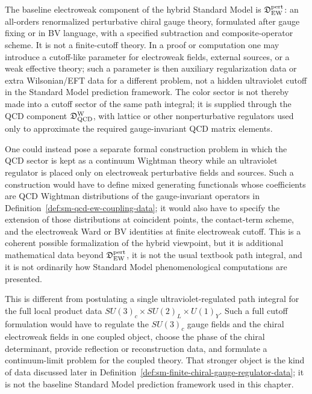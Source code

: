 \begin{remark}
\label{rem:sm-cutoff-path-integral-not-baseline}
The baseline electroweak component of the hybrid Standard Model is
\(\mathfrak D_{\rm EW}^{\rm pert}\): an all-orders renormalized perturbative
chiral gauge theory, formulated after gauge fixing or in BV language, with a
specified subtraction and composite-operator scheme.  It is not a
finite-cutoff theory.  In a proof or computation one may introduce a
cutoff-like parameter for electroweak fields, external sources, or a weak
effective theory; such a parameter is then auxiliary regularization data or
extra Wilsonian/EFT data for a different problem, not a hidden ultraviolet
cutoff in the Standard Model prediction framework.  The color sector is not
thereby made into a cutoff sector of the same path integral; it is supplied
through the QCD component \(\mathfrak D_{\rm QCD}^{\rm W}\), with lattice or
other nonperturbative regulators used only to approximate the required
gauge-invariant QCD matrix elements.

One could instead pose a separate formal construction problem in which the QCD
sector is kept as a continuum Wightman theory while an ultraviolet regulator
is placed only on electroweak perturbative fields and sources.  Such a
construction would have to define mixed generating functionals whose
coefficients are QCD Wightman distributions of the gauge-invariant operators
in Definition~\ref{def:sm-qcd-ew-coupling-data}; it would also have to
specify the extension of those distributions at coincident points, the
contact-term scheme, and the electroweak Ward or BV identities at finite
electroweak cutoff.  This is a coherent possible formalization of the hybrid
viewpoint, but it is additional mathematical data beyond
\(\mathfrak D_{\rm EW}^{\rm pert}\), it is not the usual textbook path
integral, and it is not ordinarily how Standard Model phenomenological
computations are presented.

This is different from postulating a single ultraviolet-regulated path
integral for the full local product data
\(SU(3)_c\times SU(2)_L\times U(1)_Y\).  Such a full cutoff formulation would
have to regulate the \(SU(3)_c\) gauge fields and the chiral electroweak
fields in one coupled object, choose the phase of the chiral determinant,
provide reflection or reconstruction data, and formulate a continuum-limit
problem for the coupled theory.  That stronger object is the kind of data
discussed later in
Definition~\ref{def:sm-finite-chiral-gauge-regulator-data}; it is not the
baseline Standard Model prediction framework used in this chapter.
\end{remark}

